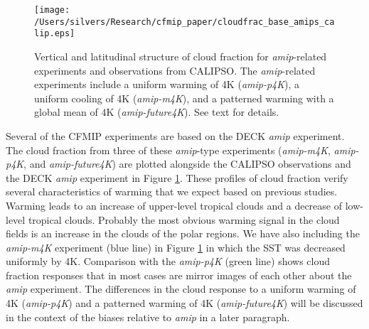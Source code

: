 \documentclass[draft]{agujournal2019}
\begin{document}
\begin{figure}
  \centering
  \texttt{[image: /Users/silvers/Research/cfmip\_paper/cloudfrac\_base\_amips\_calip.eps]}
  \caption{Vertical and latitudinal structure of cloud fraction for \textit{amip}-related experiments and observations from 
  CALIPSO.  The \textit{amip}-related experiments include a uniform warming of 4K (\textit{amip-p4K}), 
  a uniform cooling of 4K (\textit{amip-m4K}), and a 
  patterned warming with a global mean of 4K (\textit{amip-future4K}).  See text for details.}
  \label{fig:calipso_amip_comparison}
\end{figure}


Several of the CFMIP experiments are based on the DECK \textit{amip} experiment.  The cloud fraction from three 
of these \textit{amip}-type experiments (\textit{amip-m4K}, \textit{amip-p4K}, and \textit{amip-future4K}) 
are plotted alongside the CALIPSO observations and the DECK 
\textit{amip} experiment in Figure \ref{fig:calipso_amip_comparison}.  These profiles of cloud fraction verify
several characteristics of warming that we expect based on previous studies.  Warming leads to 
an increase of upper-level tropical clouds and a decrease of low-level tropical clouds.  Probably the most 
obvious warming signal in the cloud fields is an increase in the clouds of the polar regions.  We have also 
including the \textit{amip-m4K} experiment (blue line) in Figure \ref{fig:calipso_amip_comparison} in which the 
SST was decreased uniformly by 4K.  Comparison
with the \textit{amip-p4K} (green line) shows cloud fraction responses that in most cases are mirror images
of each other about the \textit{amip} experiment.   The differences in the cloud response to a uniform warming
of 4K (\textit{amip-p4K}) and a patterned warming of 4K (\textit{amip-future4K}) will be discussed in the 
context of the biases relative to \textit{amip} in a later paragraph.
\end{document}
